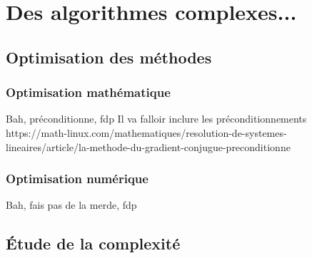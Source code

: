 \chapter{Des algorithmes complexes...}
\section{Optimisation des méthodes}
\subsection{Optimisation mathématique}
Bah, préconditionne, fdp
Il va falloir inclure les préconditionnements https://math-linux.com/mathematiques/resolution-de-systemes-lineaires/article/la-methode-du-gradient-conjugue-preconditionne
\subsection{Optimisation numérique}
Bah, fais pas de la merde, fdp
\section{Étude de la complexité}